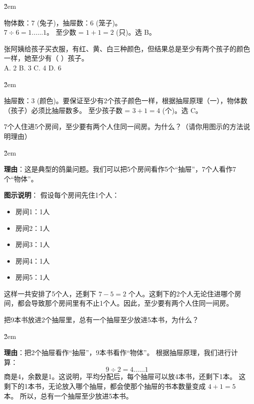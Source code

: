 \v{2em}

\begin{solution}
    物体数：7 (兔子)，抽屉数：6 (笼子)。\\
    $7 \div 6 = 1 \dots\dots 1$。
    至少数 = $1+1=2$ (只)。选 B。
\end{solution}

\begin{example}
    张阿姨给孩子买衣服，有红、黄、白三种颜色，但结果总是至少有两个孩子的颜色一样，她至少有（ \quad ）孩子。\\
    A. 2 \qquad B. 3 \qquad C. 4 \qquad D. 6
\end{example}

\v{2em}

\begin{solution}
    抽屉数：3 (颜色)。要保证至少有2个孩子颜色一样，根据抽屉原理（一），物体数（孩子）必须比抽屉数多。
    至少孩子数 = $3+1=4$ (个)。选 C。
\end{solution}

\begin{example}
    7个人住进5个房间，至少要有两个人住同一间房。为什么？（请你用图示的方法说明理由）
\end{example}

\v{2em}

\begin{solution}
    \textbf{理由}：这是典型的鸽巢问题。我们可以把5个房间看作5个“抽屉”，7个人看作7个“物体”。

    \textbf{图示说明}：
    假设每个房间先住1个人：
    \begin{itemize}
        \item 房间1：1人
        \item 房间2：1人
        \item 房间3：1人
        \item 房间4：1人
        \item 房间5：1人
    \end{itemize}
    这样一共安排了5个人，还剩下 $7-5=2$ 个人。这剩下的2个人无论住进哪个房间，都会导致那个房间里有不止1个人。因此，至少要有两个人住同一间房。
\end{solution}

\begin{example}
    把9本书放进2个抽屉里，总有一个抽屉至少放进5本书，为什么？
\end{example}

\v{2em}

\begin{solution}
    \textbf{理由}：把2个抽屉看作“抽屉”，9本书看作“物体”。
    根据抽屉原理，我们进行计算：
    $$ 9 \div 2 = 4 \dots\dots 1 $$
    商是4，余数是1。这说明，平均分配后，每个抽屉可以放4本书，还剩下1本。
    这剩下的1本书，无论放入哪个抽屉，都会使那个抽屉的书本数量变成 $4+1=5$ 本。
    所以，总有一个抽屉至少放进5本书。
\end{solution}
